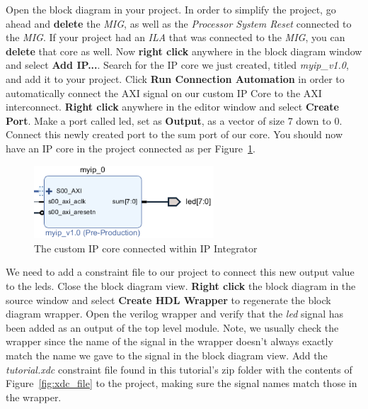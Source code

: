 \documentclass[11pt]{article}
\begin{document}
Open the block diagram in your project. In order to simplify the project, go ahead and \textbf{delete} the \textit{MIG}, as well as the \textit{Processor System Reset} connected to the \textit{MIG}. If your project had an \textit{ILA} that was connected to the \textit{MIG}, you can \textbf{delete} that core as well. Now \textbf{right click} anywhere in the block diagram window and select \textbf{Add IP...}. Search for the IP core we just created, titled \textit{myip\_v1.0}, and add it to your project. Click \textbf{Run Connection Automation} in order to automatically connect the AXI signal on our custom IP Core to the AXI interconnect. \textbf{Right click} anywhere in the editor window and select \textbf{Create Port}. Make a port called led, set as \textbf{Output}, as a vector of size 7 down to 0. Connect this newly created port to the sum port of our core. You should now have an IP core in the project connected as per Figure~\ref{fig:block_w_core}. 

\begin{figure}[!h]
    \centering
    \includegraphics[width=0.6\textwidth]{images/block_w_core.png}
    \caption{The custom IP core connected within IP Integrator}
    \label{fig:block_w_core}
\end{figure}

We need to add a constraint file to our project to connect this new output value to the leds. Close the block diagram view. \textbf{Right click} the block diagram in the source window and select \textbf{Create HDL Wrapper} to regenerate the block diagram wrapper. Open the verilog wrapper and verify that the \textit{led} signal has been added as an output of the top level module. Note, we usually check the wrapper since the name of the signal in the wrapper doesn't always exactly match the name we gave to the signal in the block diagram view. Add the \textit{tutorial.xdc} constraint file found in this tutorial's zip folder with the contents of Figure~\ref{fig:xdc_file} to the project, making sure the signal names match those in the wrapper.
\end{document}
